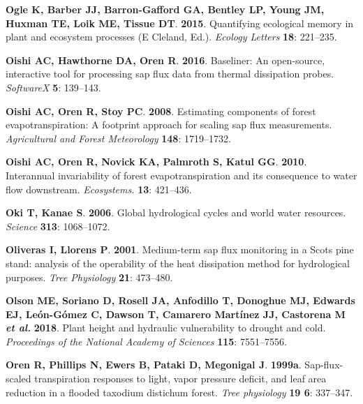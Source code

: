 \documentclass[11pt,twoside]{reedthesis}
\begin{document}
\hypertarget{ref-ogle_quantifying_2015}{}
\textbf{\textnormal{Ogle K}, \textnormal{Barber JJ},
\textnormal{Barron-Gafford GA}, \textnormal{Bentley LP},
\textnormal{Young JM}, \textnormal{Huxman TE}, \textnormal{Loik ME},
\textnormal{Tissue DT}}. \textbf{2015}. Quantifying ecological memory in
plant and ecosystem processes (E Cleland, Ed.). \emph{Ecology Letters}
\textbf{18}: 221--235.

\hypertarget{ref-Oishi2016}{}
\textbf{\textnormal{Oishi AC}, \textnormal{Hawthorne DA},
\textnormal{Oren R}}. \textbf{2016}. Baseliner: An open-source,
interactive tool for processing sap flux data from thermal dissipation
probes. \emph{SoftwareX} \textbf{5}: 139--143.

\hypertarget{ref-Oishi2008}{}
\textbf{\textnormal{Oishi AC}, \textnormal{Oren R}, \textnormal{Stoy
PC}}. \textbf{2008}. Estimating components of forest evapotranspiration:
A footprint approach for scaling sap flux measurements.
\emph{Agricultural and Forest Meteorology} \textbf{148}: 1719--1732.

\hypertarget{ref-Oishi2010}{}
\textbf{\textnormal{Oishi AC}, \textnormal{Oren R}, \textnormal{Novick
KA}, \textnormal{Palmroth S}, \textnormal{Katul GG}}. \textbf{2010}.
Interannual invariability of forest evapotranspiration and its
consequence to water flow downstream. \emph{Ecosystems.} \textbf{13}:
421--436.

\hypertarget{ref-Oki2006}{}
\textbf{\textnormal{Oki T}, \textnormal{Kanae S}}. \textbf{2006}. Global
hydrological cycles and world water resources. \emph{Science}
\textbf{313}: 1068--1072.

\hypertarget{ref-Oliveras2001}{}
\textbf{\textnormal{Oliveras I}, \textnormal{Llorens P}}. \textbf{2001}.
Medium-term sap flux monitoring in a Scots pine stand: analysis of the
operability of the heat dissipation method for hydrological purposes.
\emph{Tree Physiology} \textbf{21}: 473--480.

\hypertarget{ref-olson_plant_2018}{}
\textbf{\textnormal{Olson ME}, \textnormal{Soriano D},
\textnormal{Rosell JA}, \textnormal{Anfodillo T}, \textnormal{Donoghue
MJ}, \textnormal{Edwards EJ}, \textnormal{León-Gómez C},
\textnormal{Dawson T}, \textnormal{Camarero Martínez JJ},
\textnormal{Castorena M} \emph{et al.}} \textbf{2018}. Plant height and
hydraulic vulnerability to drought and cold. \emph{Proceedings of the
National Academy of Sciences} \textbf{115}: 7551--7556.

\hypertarget{ref-Oren1999b}{}
\textbf{\textnormal{Oren R}, \textnormal{Phillips N}, \textnormal{Ewers
B}, \textnormal{Pataki D}, \textnormal{Megonigal J}}. \textbf{1999a}.
Sap-flux-scaled transpiration responses to light, vapor pressure
deficit, and leaf area reduction in a flooded taxodium distichum forest.
\emph{Tree physiology} \textbf{19 6}: 337--347.
\end{document}
